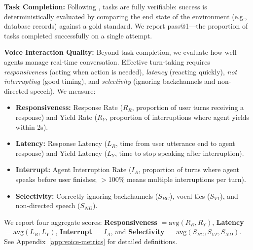 \textbf{Task Completion:} Following \tautwobench{}, tasks are fully verifiable: success is deterministically evaluated by comparing the end state of the environment (e.g., database records) against a gold standard. We report pass@1---the proportion of tasks completed successfully on a single attempt.

\textbf{Voice Interaction Quality:} Beyond task completion, we evaluate how well agents manage real-time conversation. Effective turn-taking requires \textit{responsiveness} (acting when action is needed), \textit{latency} (reacting quickly), \textit{not interrupting} (good timing), and \textit{selectivity} (ignoring backchannels and non-directed speech). We measure:
\begin{itemize}[nosep,leftmargin=*]
    \item \textbf{Responsiveness:} Response Rate ($R_R$, proportion of user turns receiving a response) and Yield Rate ($R_Y$, proportion of interruptions where agent yields within 2s).
    \item \textbf{Latency:} Response Latency ($L_R$, time from user utterance end to agent response) and Yield Latency ($L_Y$, time to stop speaking after interruption).
    \item \textbf{Interrupt:} Agent Interruption Rate ($I_A$, proportion of turns where agent speaks before user finishes; $>$100\% means multiple interruptions per turn).
    \item \textbf{Selectivity:} Correctly ignoring backchannels ($S_{BC}$), vocal tics ($S_{VT}$), and non-directed speech ($S_{ND}$).
\end{itemize}
We report four aggregate scores: \textbf{Responsiveness} $= \mathrm{avg}(R_R, R_Y)$, \textbf{Latency} $= \mathrm{avg}(L_R, L_Y)$, \textbf{Interrupt} $= I_A$, and \textbf{Selectivity} $= \mathrm{avg}(S_{BC}, S_{VT}, S_{ND})$. See Appendix~\ref{app:voice-metrics} for detailed definitions.
